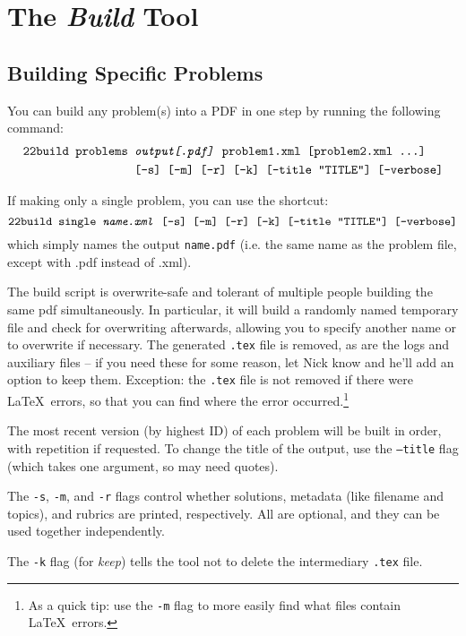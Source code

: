 \section{The \textit{Build} Tool}
  \subsection{Building Specific Problems}
    You can build any problem(s) into a PDF in one step by running the 
    following command:
    \begin{align*}\texttt{22build }\texttt{problems }&\texttt{\textit{output[.pdf]} problem1.xml [problem2.xml \dots]}\\
        ~&\texttt{[-s] [-m] [-r] [-k] [--title ``TITLE''] [--verbose]}\end{align*}
        
    If making only a single problem, you can use the shortcut:
    \[\texttt{22build }\texttt{single \textit{name.xml} 
        [-s] [-m] [-r] [-k] [--title ``TITLE''] [--verbose]}\]
    which simply names the output \texttt{name.pdf} (i.e. the same name as 
    the problem file, except with .pdf instead of .xml).
    
    The build script is overwrite-safe and tolerant of multiple people 
    building the same pdf simultaneously. In particular, it will build a 
    randomly named temporary file and check for overwriting afterwards, 
    allowing you to specify another name or to overwrite if necessary. The 
    generated \texttt{.tex} file is removed, as are the logs and auxiliary 
    files -- if you need these for some reason, let Nick know and he'll 
    add an option to keep them. Exception: the \texttt{.tex} file is not 
    removed if there were \LaTeX\ errors, so that you can find where the 
    error occurred.\footnote{As a quick tip: use the \texttt{-m} flag to 
    more easily find what files contain \LaTeX\ errors.}
    
    The most recent version (by highest ID) of each problem will be built 
    in order, with repetition if requested. To change the 
    title of the output, use the \texttt{--title} flag (which takes one 
    argument, so may need quotes).
    
    The \texttt{-s}, \texttt{-m}, and \texttt{-r} flags control whether 
    solutions, metadata (like filename and topics), and rubrics are 
    printed, respectively. All are optional, and they can be used together 
    independently.
    
    The \texttt{-k} flag (for \textit{keep}) tells the tool not to delete the
    intermediary \texttt{.tex} file.
    
